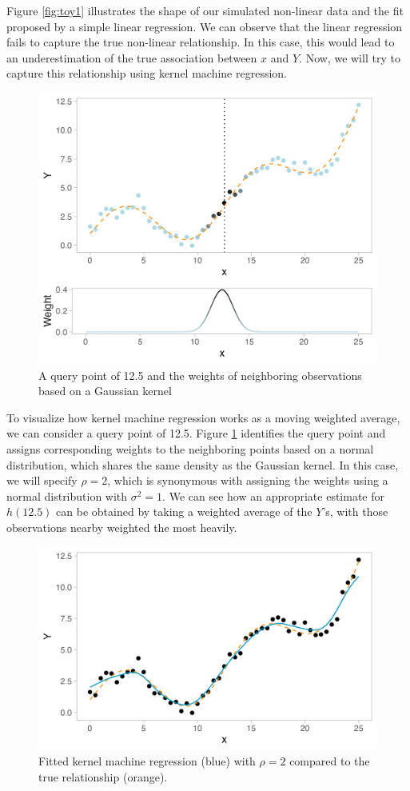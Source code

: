 \documentclass[12pt, twoside]{amherstthesis}
\begin{document}
Figure \ref{fig:toy1} illustrates the shape of our simulated non-linear data and the fit proposed by a simple linear regression. We can observe that the linear regression fails to capture the true non-linear relationship. In this case, this would lead to an underestimation of the true association between \(x\) and \(Y\). Now, we will try to capture this relationship using kernel machine regression.
\begin{figure}

{\centering \includegraphics[width=0.75\linewidth]{figures/ch3_toy2} 

}

\caption{A query point of 12.5 and the weights of neighboring observations based on a Gaussian kernel}\label{fig:toy2}
\end{figure}
To visualize how kernel machine regression works as a moving weighted average, we can consider a query point of 12.5. Figure \ref{fig:toy2} identifies the query point and assigns corresponding weights to the neighboring points based on a normal distribution, which shares the same density as the Gaussian kernel. In this case, we will specify \(\rho = 2\), which is synonymous with assigning the weights using a normal distribution with \(\sigma^2=1\). We can see how an appropriate estimate for \(h(12.5)\) can be obtained by taking a weighted average of the \(Y\)'s, with those observations nearby weighted the most heavily.
\begin{figure}

{\centering \includegraphics[width=0.75\linewidth]{figures/ch3_toy3} 

}

\caption{Fitted kernel machine regression (blue) with $\rho=2$ compared to the true relationship (orange).}\label{fig:toy3}
\end{figure}
\end{document}
